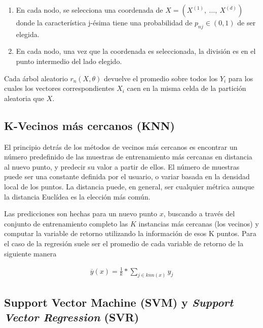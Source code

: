       \begin{enumerate}
        \item En cada nodo, se selecciona una coordenada de $X = (X^{(1)}, \ \dots,\ X^{(d)})$
              donde la característica j-ésima tiene una probabilidad de $p_{nj} \in (0,1)$
              de ser elegida.
        \item En cada nodo, una vez que la coordenada es seleccionada, la división es
              en el punto intermedio del lado elegido.
      \end{enumerate}

      Cada árbol aleatorio $r_{n}(X, \theta)$ devuelve el promedio sobre todos los
      $Y_{i}$ para los cuales los vectores correspondientes $X_{i}$ caen en la misma
      celda de la partición aleatoria que $X$.


  \subsection{K-Vecinos más cercanos (KNN)}
    \par El principio detrás de los métodos de vecinos más cercanos es encontrar un
      número predefinido de las muestras de entrenamiento más cercanas en distancia
      al nuevo punto, y predecir su valor a partir de ellos.
      El número de muestras puede ser una constante definida por el usuario, o
      variar basada en la densidad local de los puntos. La distancia puede, en general,
      ser cualquier métrica aunque la distancia Euclídea es la elección más común.

    \par Las predicciones son hechas para un nuevo punto $x$, buscando a través del conjunto
      de entrenamiento completo las $K$ instancias más cercanas (los vecinos) y computar
      la variable de retorno utilizando la información de esos K puntos. Para el caso
      de la regresión suele ser el promedio de cada variable de retorno de la siguiente
      manera

      \begin{align}
        \overline{y}(x) = \frac{1}{k} * \sum_{j \in knn(x)} y_{j}
      \end{align}



  \subsection{Support Vector Machine (SVM) y \textit{Support Vector Regression} (SVR)}

